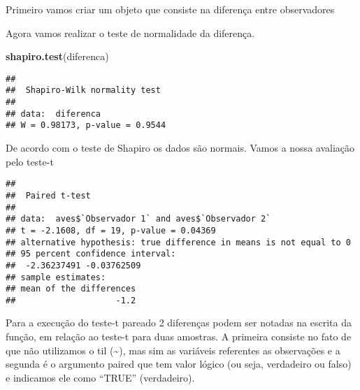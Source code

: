 \documentclass[titlepage, oneside, openany, a4paper]{book}
\newenvironment{Shaded}{\begin{snugshade}}{\end{snugshade}}
\newcommand{\DataTypeTok}[1]{\textcolor[rgb]{0.13,0.29,0.53}{#1}}
\newcommand{\FloatTok}[1]{\textcolor[rgb]{0.00,0.00,0.81}{#1}}
\newcommand{\KeywordTok}[1]{\textcolor[rgb]{0.13,0.29,0.53}{\textbf{#1}}}
\newcommand{\NormalTok}[1]{#1}
\newcommand{\OperatorTok}[1]{\textcolor[rgb]{0.81,0.36,0.00}{\textbf{#1}}}
\newcommand{\OtherTok}[1]{\textcolor[rgb]{0.56,0.35,0.01}{#1}}
\newcommand{\StringTok}[1]{\textcolor[rgb]{0.31,0.60,0.02}{#1}}
\begin{document}
Primeiro vamos criar um objeto que consiste na diferença entre observadores

\begin{Shaded}
\end{Shaded}

Agora vamos realizar o teste de normalidade da diferença.

\begin{Shaded}
\begin{Highlighting}[]
\KeywordTok{shapiro.test}\NormalTok{(diferenca)}
\end{Highlighting}
\end{Shaded}

\begin{verbatim}
## 
##  Shapiro-Wilk normality test
## 
## data:  diferenca
## W = 0.98173, p-value = 0.9544
\end{verbatim}

De acordo com o teste de Shapiro os dados são normais. Vamos a nossa avaliação pelo teste-t

\begin{Shaded}
\end{Shaded}

\begin{verbatim}
## 
##  Paired t-test
## 
## data:  aves$`Observador 1` and aves$`Observador 2`
## t = -2.1608, df = 19, p-value = 0.04369
## alternative hypothesis: true difference in means is not equal to 0
## 95 percent confidence interval:
##  -2.36237491 -0.03762509
## sample estimates:
## mean of the differences 
##                    -1.2
\end{verbatim}

Para a execução do teste-t pareado 2 diferenças podem ser notadas na escrita da função, em relação ao teste-t para duas amostras. A primeira consiste no fato de que não utilizamos o til (\textasciitilde{}), mas sim as variáveis referentes as observações e a segunda é o argumento paired que tem valor lógico (ou seja, verdadeiro ou falso) e indicamos ele como ``TRUE'' (verdadeiro).
\end{document}
